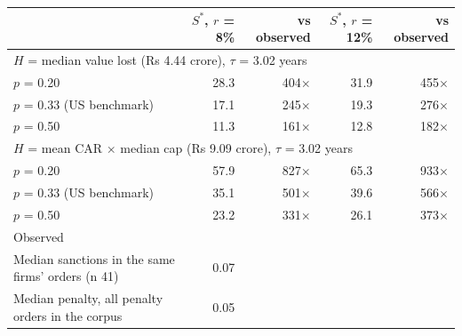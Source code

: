 \begin{tabular*}{\textwidth}[]{l@{\extracolsep\fill}rrrr}
\toprule
 & $S^*$, $r$ = 8\% & vs observed & $S^*$, $r$ = 12\% & vs observed\\
\midrule
\multicolumn{5}{l}{$H$ = median value lost (Rs 4.44 crore), $\tau$ = 3.02 years}\\
$p$ = 0.20 & 28.3 & 404$\times$ & 31.9 & 455$\times$\\
$p$ = 0.33 (US benchmark) & 17.1 & 245$\times$ & 19.3 & 276$\times$\\
$p$ = 0.50 & 11.3 & 161$\times$ & 12.8 & 182$\times$\\
\midrule
\multicolumn{5}{l}{$H$ = mean CAR $\times$ median cap (Rs 9.09 crore), $\tau$ = 3.02 years}\\
$p$ = 0.20 & 57.9 & 827$\times$ & 65.3 & 933$\times$\\
$p$ = 0.33 (US benchmark) & 35.1 & 501$\times$ & 39.6 & 566$\times$\\
$p$ = 0.50 & 23.2 & 331$\times$ & 26.1 & 373$\times$\\
\midrule
\multicolumn{5}{l}{Observed}\\
Median sanctions in the same firms' orders (n 41) & 0.07 &  &  & \\
Median penalty, all penalty orders in the corpus & 0.05 &  &  & \\
\bottomrule
\end{tabular*}
